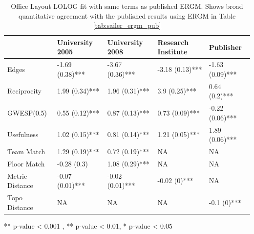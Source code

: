 \documentclass[
]{statsoc}
\begin{document}
\begin{table}

\caption{\label{tab:unnamed-chunk-3}\label{tab:sailer_lolog_pub}Office Layout LOLOG fit with same terms as published ERGM. Shows broad quantitative agreement with the published results using ERGM in Table \ref{tab:sailer_ergm_pub}}
\centering
\begin{threeparttable}
\begin{tabular}[t]{lllll}
\toprule
  & University 2005 & University 2008 & Research Institute & Publisher\\
\midrule
\rowcolor{gray!6}  Edges & -1.69 (0.38)*** & -3.67 (0.36)*** & -3.18 (0.13)*** & -1.63 (0.09)***\\
Reciprocity & 1.99 (0.34)*** & 1.96 (0.31)*** & 3.9 (0.25)*** & 0.64 (0.2)***\\
\rowcolor{gray!6}  GWESP(0.5) & 0.55 (0.12)*** & 0.87 (0.13)*** & 0.73 (0.09)*** & -0.22 (0.06)***\\
Usefulness & 1.02 (0.15)*** & 0.81 (0.14)*** & 1.21 (0.05)*** & 1.89 (0.06)***\\
\rowcolor{gray!6}  Team Match & 1.29 (0.19)*** & 0.72 (0.19)*** & NA & NA\\
\addlinespace
Floor Match & -0.28 (0.3) & 1.08 (0.29)*** & NA & NA\\
\rowcolor{gray!6}  Metric Distance & -0.07 (0.01)*** & -0.02 (0.01)*** & -0.02 (0)*** & NA\\
Topo Distance & NA & NA & NA & -0.1 (0)***\\
\bottomrule
\end{tabular}
\begin{tablenotes}
\item *** p-value < 0.001 , ** p-value < 0.01, * p-value < 0.05
\end{tablenotes}
\end{threeparttable}
\end{table}
\end{document}
